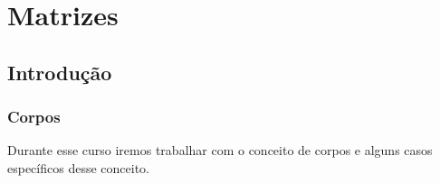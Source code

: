 \chapter{Matrizes}
\section{Introdução}

\subsection{Corpos}
Durante esse curso iremos trabalhar com o conceito de corpos e alguns casos específicos desse conceito.

